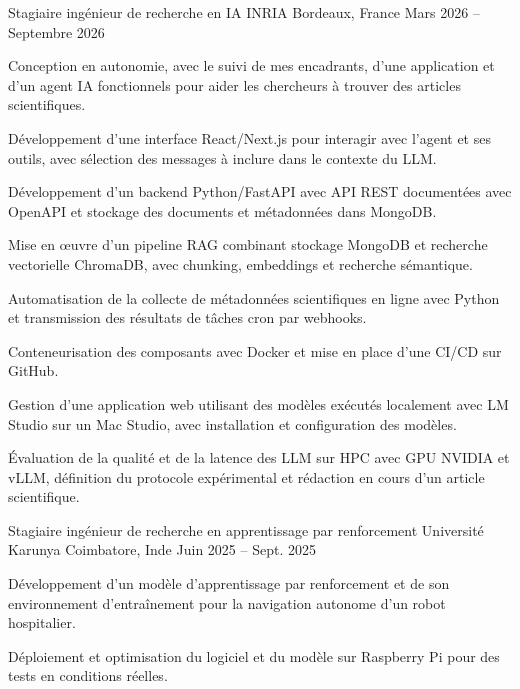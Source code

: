 
\begin{cventries}
  \cventry
    {Stagiaire ingénieur de recherche en IA}
    {INRIA}
    {Bordeaux, France}
    {Mars 2026 -- Septembre 2026}
    {
      \begin{cvitems}
        \item {Conception en autonomie, avec le suivi de mes encadrants, d’une application et d’un agent IA fonctionnels pour aider les chercheurs à trouver des articles scientifiques.}
        \item {Développement d’une interface React/Next.js pour interagir avec l’agent et ses outils, avec sélection des messages à inclure dans le contexte du LLM.}
        \item {Développement d’un backend Python/FastAPI avec API REST documentées avec OpenAPI et stockage des documents et métadonnées dans MongoDB.}
        \item {Mise en œuvre d’un pipeline RAG combinant stockage MongoDB et recherche vectorielle ChromaDB, avec chunking, embeddings et recherche sémantique.}
        \item {Automatisation de la collecte de métadonnées scientifiques en ligne avec Python et transmission des résultats de tâches cron par webhooks.}
        \item {Conteneurisation des composants avec Docker et mise en place d’une CI/CD sur GitHub.}
        \item {Gestion d’une application web utilisant des modèles exécutés localement avec LM Studio sur un Mac Studio, avec installation et configuration des modèles.}
        \item {Évaluation de la qualité et de la latence des LLM sur HPC avec GPU NVIDIA et vLLM, définition du protocole expérimental et rédaction en cours d’un article scientifique.}
      \end{cvitems}
    }

  \cventry
    {Stagiaire ingénieur de recherche en apprentissage par renforcement}
    {Université Karunya}
    {Coimbatore, Inde}
    {Juin 2025 -- Sept. 2025}
    {
      \begin{cvitems}
        \item {Développement d’un modèle d’apprentissage par renforcement et de son environnement d’entraînement pour la navigation autonome d’un robot hospitalier.}
        \item {Déploiement et optimisation du logiciel et du modèle sur Raspberry Pi pour des tests en conditions réelles.}
      \end{cvitems}
    }
\end{cventries}
